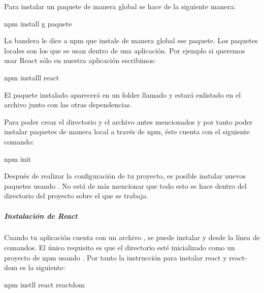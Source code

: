 Para instalar un paquete de manera global se hace de la siguiente manera:

%
\begin{sphinxVerbatim}[commandchars=\\\{\}]
npm install \PYGZhy{}g \PYGZlt{}paquete\PYGZgt{}
\end{sphinxVerbatim}

La bandera  le dice a npm que instale de manera global ese paquete. Los
paquetes locales son los que se usan dentro de una aplicación. Por ejemplo
si queremos usar React sólo en nuestra aplicación escribimos:

%
\begin{sphinxVerbatim}[commandchars=\\\{\}]
npm installl react
\end{sphinxVerbatim}

El paquete instalado aparecerá en un folder llamado  y estará
enlistado en el archivo  junto con las otras dependencias.

Para poder crear el directorio y el archivo antes mencionados y por tanto
poder instalar paquetes de manera local a través de npm, éste cuenta con el
siguiente comando:

%
\begin{sphinxVerbatim}[commandchars=\\\{\}]
npm init
\end{sphinxVerbatim}

Después de realizar la configuración de tu proyecto, es posible instalar nuevos
paquetes usando . No está de más mencionar que todo
esto se hace dentro del directorio del proyecto sobre el que se trabaja.


\subparagraph{Instalación de React}
\label{\detokenize{reactjs:instalacion-de-react}}
Cuando tu aplicación cuenta con un archivo , se puede instalar
 y  desde la línea de comandos. El único requisito es que el
directorio esté inicializado como un proyecto de npm usando . Por
tanto la instrucción para instalar react y react-dom es la siguiente:

%
\begin{sphinxVerbatim}[commandchars=\\\{\}]
npm instll react react\PYGZhy{}dom
\end{sphinxVerbatim}

